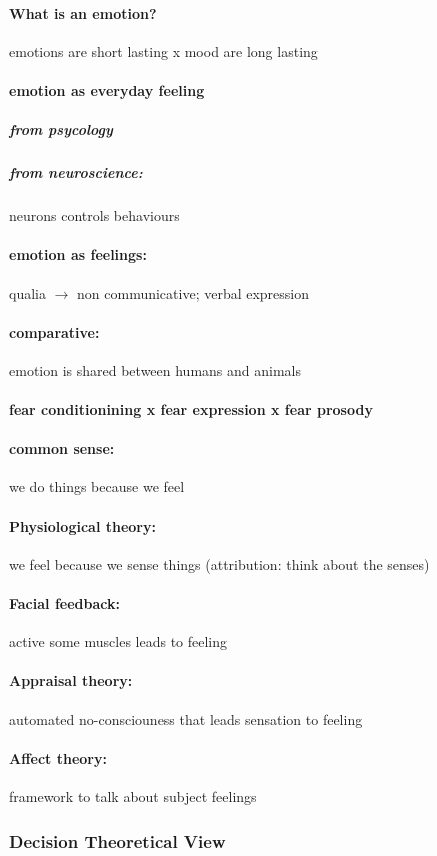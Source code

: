 \documentclass[12pt,article,oneside,a4paper]{memoir}
\begin{document}
\paragraph{What is an emotion?} emotions are short lasting x mood are long lasting
\paragraph{emotion as everyday feeling}
\subparagraph{from psycology}
\subparagraph{from neuroscience:} neurons controls behaviours
\paragraph{emotion as feelings:} qualia $\rightarrow$ non communicative; verbal expression
\paragraph{comparative:} emotion is shared between humans and animals
\paragraph{fear conditionining x fear expression x fear prosody}

\paragraph{common sense:} we do things because we feel
\paragraph{Physiological theory:} we feel because we sense things (attribution: think about the senses)
\paragraph{Facial feedback:} active some muscles leads to feeling
\paragraph{Appraisal theory:} automated no-consciouness that leads sensation to feeling
\paragraph{Affect theory:} framework to talk about subject feelings

\subsubsection{ Decision Theoretical View}
\end{document}
